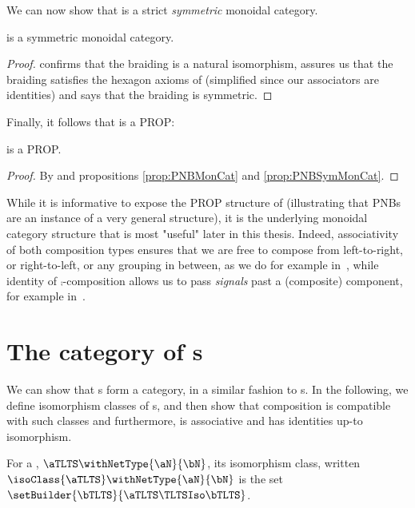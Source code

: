 We can now show that \PNBCat is a strict \emph{symmetric} monoidal category.

\begin{proposition}\label{prop:PNBSymMonCat}
    \PNBCat{} is a symmetric monoidal category.
\end{proposition}
\begin{proof}
     confirms that the braiding is a natural
    isomorphism,  assures us that the
    braiding satisfies the hexagon axioms of 
    (simplified since our associators are identities) and
     says that the braiding is symmetric.
\end{proof}

Finally, it follows that \PNBCat{} is a PROP:

\begin{proposition}\label{prop:PNBPROP}
    \PNBCat{} is a PROP.
\end{proposition}
\begin{proof}
    By \cite[Proposition 5.1]{Bruni2013} and propositions \ref{prop:PNBMonCat}
    and \ref{prop:PNBSymMonCat}.
\end{proof}

While it is informative to expose the PROP structure of \PNBCat{} (illustrating that PNBs are an
instance of a very general structure), it is the underlying monoidal category structure that is
most "useful" later in this thesis. Indeed, associativity of both composition types ensures that we
are free to compose from left-to-right, or right-to-left, or any grouping in between, as we do for
example in~, while identity of $\comp$-composition allows us to
pass \emph{signals} past a (composite) component, for example in~.

\section{The category of \TLTS{}s}

We can show that \TLTS{}s form a category, in a similar fashion to \PNB{}s. In
the following, we define isomorphism classes of \TLTS{}s, and then show that
composition is compatible with such classes and furthermore, is
associative and has identities up-to isomorphism.

\begin{definition}
    For a \TLTS{}, $\aTLTS \withNetType{\aN}{\bN}$, its \TLTS{} isomorphism
    class, written $\isoClass{\aTLTS} \withNetType{\aN}{\bN}$ is the set
    $\setBuilder{\bTLTS}{\aTLTS \TLTSIso \bTLTS}$.
\end{definition}

